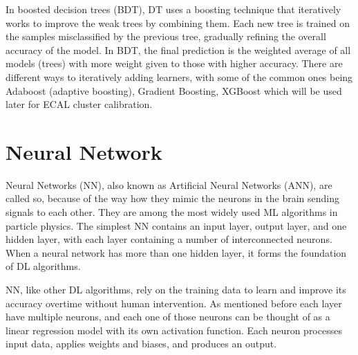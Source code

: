 In boosted decision trees (BDT), DT uses a boosting technique that iteratively works to improve the weak trees by combining them. %
Each new tree is trained on the samples misclassified by the previous tree, gradually refining the overall accuracy of the model.
In BDT, the final prediction is the weighted average of all models (trees) with more weight given to those with higher accuracy.
There are different ways to iteratively adding learners, %
with some of the common ones being Adaboost (adaptive boosting), Gradient Boosting, XGBoost which will be used later for ECAL cluster calibration.

\section{Neural Network}
Neural Networks (NN), also known as Artificial Neural Networks (ANN), are called so, because of the way how they mimic the neurons in the brain sending signals to each other.
They are among the most widely used ML algorithms in particle physics.
The simplest NN contains an input layer, output layer, and one hidden layer, %
with each layer containing a number of interconnected neurons.
When a neural network has more than one hidden layer, it forms the foundation of DL algorithms.

NN, like other DL algorithms, rely on the training data to learn and improve its accuracy overtime without human intervention.
As mentioned before each layer have multiple neurons, and each one of those neurons
can be thought of as a linear regression model with its own activation function. Each neuron processes input data, applies weights and biases, and produces an output.

